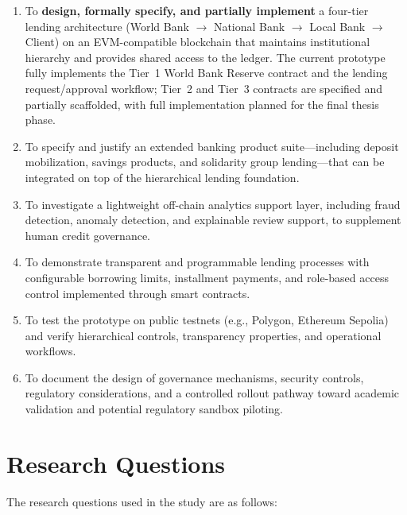 \documentclass[12pt,a4paper]{report}
\begin{document}
\begin{enumerate}[noitemsep]
\item To \textbf{design, formally specify, and partially implement} a four-tier lending architecture (World Bank $\to$ National Bank $\to$ Local Bank $\to$ Client) on an EVM-compatible blockchain that maintains institutional hierarchy and provides shared access to the ledger. The current prototype fully implements the Tier~1 World Bank Reserve contract and the lending request/approval workflow; Tier~2 and Tier~3 contracts are specified and partially scaffolded, with full implementation planned for the final thesis phase.
\item To specify and justify an extended banking product suite---including deposit mobilization, savings products, and solidarity group lending---that can be integrated on top of the hierarchical lending foundation.
\item To investigate a lightweight off-chain analytics support layer, including fraud detection, anomaly detection, and explainable review support, to supplement human credit governance.
\item To demonstrate transparent and programmable lending processes with configurable borrowing limits, installment payments, and role-based access control implemented through smart contracts.
\item To test the prototype on public testnets (e.g., Polygon, Ethereum Sepolia) and verify hierarchical controls, transparency properties, and operational workflows.
\item To document the design of governance mechanisms, security controls, regulatory considerations, and a controlled rollout pathway toward academic validation and potential regulatory sandbox piloting.
\end{enumerate}

\section{Research Questions}

The research questions used in the study are as follows:
\end{document}
